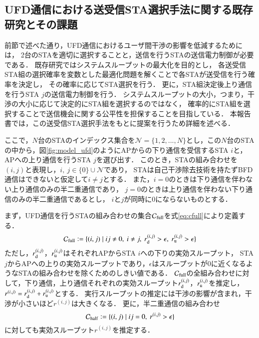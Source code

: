 \documentclass[technicalreport]{ieicej}
\newcommand{\sij}{(i,j)}
\newcommand{\mN}{{\mathcal N}}
\newcommand{\rd}{r^{\sij}_{\rm d}}
\newcommand{\ru}{r^{\sij}_{\rm u}}
\newcommand{\rij}{r^{\sij}}
\def\equiv{\mathrel{\mathop:}=}
\begin{document}
	\subsection{UFD通信における送受信STA選択手法に関する既存研究とその課題}\label{sec:conventional}
		前節で述べた通り，UFD通信におけるユーザ間干渉の影響を低減するためには，
		2台のSTAを適切に選択することと，送信を行うSTAの送信電力制御が必要である．
		既存研究\cite{promac}ではシステムスループットの最大化を目的とし，
		各送受信STA組の選択確率を変数とした最適化問題を解くことで各STAが送受信を行う確率を決定し，
		その確率に応じてSTA選択を行う．
		更に，STA組決定後上り通信を行うSTA $j$の送信電力制御を行う．
		システムスループットの大小，つまり，干渉の大小に応じて決定的にSTA組を選択するのではなく，
		確率的にSTA組を選択することで送信機会に関する公平性を担保することを目指している．
		本報告書では，この送受信STA選択手法をもとに提案を行うため詳細を述べる．
		\par
		ここで，$N$台のSTAのインデックス集合を$\mN=\{1,2,...,N\}$とし，この$N$台のSTAの中から，図\ref{fig:model_ufd}のようにAPからの下り通信を受信するSTA $i$と，APへの上り通信を行うSTA $j$を選び出す．
		このとき，STAの組み合わせを$\sij$と表現し，$i,\ j \in \{0\}\cup \mN$であり，
		STAは自己干渉除去技術を持たずBFD通信はできないと仮定して$i\neq j$とする．
		また，$i=0$のときは下り通信を伴わない上り通信のみの半二重通信であり，
		$j=0$のときは上り通信を伴わない下り通信のみの半二重通信であるとし，
		$i$と$j$が同時に0にならないものとする．
		\par
		まず，UFD通信を行うSTAの組み合わせの集合${\mathcal C}_{\rm full}$を式\eqref{eq:cfull}により定義する．
		\begin{equation}
			{\mathcal C}_{\rm full} \equiv \{\sij\mid ij\neq0,\ i\neq j,\ r^{\sij}_{\rm d}>\epsilon,\ r^{\sij}_{\rm u}>\epsilon\} \label{eq:cfull}
		\end{equation}
		ただし，$r_{\rm d}^{\sij}$，$r_{\rm u}^{\sij}$はそれぞれAPからSTA $i$への下りの実効スループット，
		STA $j$からAPへの上りの実効スループットであり，$\epsilon$はスループットが0に近くなるようなSTAの組み合わせを除くためのしきい値である．
		${\mathcal C}_{\rm full}$の全組み合わせに対して，下り通信，上り通信それぞれの実効スループット$\rd$，$\ru$を推定し，$\rij=\rd + \ru$とする．
		実行スループットの推定には干渉の影響が含まれ，干渉が小さいほど$\rij$は大きくなる．
		更に，半二重通信の組み合わせ
		\begin{equation}
			{\mathcal C}_{\rm half} \equiv \{\sij\mid ij=0,\ \rij >\epsilon\}
		\end{equation}
		に対しても実効スループット$\rij$を推定する．
\end{document}
